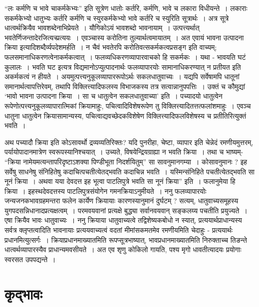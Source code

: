 {“लः कर्मणि च भावे चाकर्मकेभ्यः” इति सूत्रेण धातोः कर्तरि, कर्मणि, भावे च लकारा विधीयन्ते~। लकाराः सकर्मकेभ्यो धातुभ्यः कर्तरि कर्मणि च स्युरकर्मकेभ्यो भावे कर्तरि च स्युरिति सूत्रार्थः~। अत्र सूत्रे धात्वर्थक्रियैव भावशब्देनाभिप्रेयते~। यौगिकोऽयं भावशब्दो भावनायाम्~। उत्पत्त्यर्थात् भवतेर्णिजन्तादेरजित्यच्प्रत्ययः~। एवञ्चास्य करोतिना तुल्यार्थत्वमायातम्~। अत एवायं भावना उत्पादना क्रिया इत्यादिशब्दैर्व्यपदेशमर्हति~। न चैवं भवतेरपि करोतिवत्सकर्मकत्वप्रसङ्ग इति वाच्यम्; फलसमानाधिकरणत्वेनाकर्मकत्वात्~। फलव्यधिकरणव्यापारवाचको हि सकर्मकः~। यथा - भावयति घटं कुलालः~। भवति घट इत्यत्र विद्यमानोऽप्युत्पादनार्थः फलव्यापारयोः सामानाधिकरण्यात् न प्रतीयत इति अकर्मकत्वं न हीयते~। अयमुत्पत्त्यनुकूलव्यापाररूपोऽर्थः सकलधातुवाच्यः~। यद्यपि सर्वेषामपि धातूनां समानार्थत्वापत्तिरेवम्, तथापि विक्लित्त्यादिफलस्य विभाजकस्य तत्र सत्वान्नानुपपत्तिः~। उक्तं च कौमुद्यां ‘भावो भावना उत्पादना क्रिया~। सा च धातुत्वेन सकलधातुवाच्या’ इति~। पच्यादयो धातुत्वेन रूपेणोत्पत्त्यनुकूलव्यापारात्मिकां क्रियामाहुः, पचित्वादिविशेषरूपेण तु विक्लित्त्यादितत्तत्फलांशमाहुः~। एवञ्च धातुना धातुत्वेन क्रियासामान्यस्य, पचित्वाद्यवच्छेदकविशेषेण विक्लित्त्यादिफलविशेषस्य च प्रतीतिरित्युक्तं भवति~। 

अथ पच्यादौ क्रिया इति कोऽसावर्थो द्रव्यव्यतिरिक्तः? यदि पुनरीहा, चेष्टा, व्यापार इति चेन्नेदं रमणीयमुत्तरम्, पर्यायोपादानमात्रेण स्वरूपस्यानिश्चयात्~। उच्यते, विषयेन्द्रियग्राह्या न भवति क्रिया~। तथा च भाष्यम्-  “क्रिया नामेयमत्यन्तापरिदृष्टाऽशक्या पिण्डीभूता निदर्शयितुम्” सा सावनुमानगम्या~। कोसावनुमानः ? इह सर्वेषु साधनेषु संनिहितेषु कदाचित्पचतीत्येतद्भवति कदाचिन्न भवति~। यस्मिन्संनिहिते पचतीत्येतद्भवति सा नूनं क्रिया~। अथवा यया देवदत्त इह भूत्वा पाटलिपुत्रे भवति सा नूनं क्रिया” इति~। फलानुमेया हि क्रिया~। इहस्थदेवदत्तस्य पाटलिपुत्रसंयोगेन गमनक्रियाऽनुमीयते~। ननु फलव्यापारयोः जन्यजनकभावग्रहमन्तरा फलेन कार्येण क्रियायाः कारणस्यानुमानं दुर्घटम् ? सत्यम्, धातुवाच्यसमूहस्य युगपदसन्निधानादप्रत्यक्षत्वम्~। परमवयवानां प्रत्यक्षे बुद्ध्या सर्वानवयवान् सङ्कलय्य पचतीति प्रयुज्यते~। एषा क्रियैव भावः धातुवाच्यः~। ननु क्रियाया धातुवाच्यत्वे तद्विशेष्यकबोधो न स्यात्, प्रत्ययार्थप्राधान्यस्य सर्वत्र क्लृप्तत्वादिति भावनायाः प्रत्ययवाच्यत्वं वदतां मीमांसकमतमेव रमणीयमिति चेदाहुः - प्रत्ययार्थः प्रधानमित्युत्सर्गः~। क्रियाप्रधानमाख्यातमिति रूपप्सूत्रभाष्यात्, भावप्रधानमाख्यातमिति निरुक्ताच्च तिङन्ते धात्वर्थव्यापारस्यैव प्राधान्यमवसीयते~। अत एव शृणु कोकिलो गायति, पश्य मृगो धावतीत्यादयः प्रयोगाः स्वरसत उपपद्यन्ते~। 

\section*{कृद्भावः} 

}

